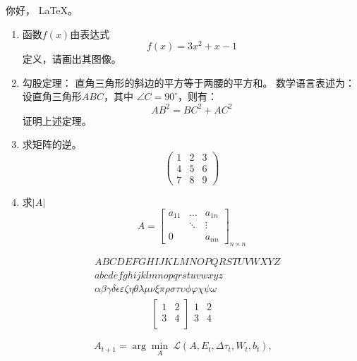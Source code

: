 \documentclass[UTF8,a4paper,12pt]{ctexart}
\newcommand{\degree}{^\circ}
\begin{document}
 你好， \LaTeX 。
 
 \begin{enumerate}
 	\item 函数$f(x)$由表达式$$f(x)=3x^2+x-1$$定义，请画出其图像。
 	
 	\item
 	勾股定理：
 	直角三角形的斜边的平方等于两腰的平方和。
 	数学语言表述为：设直角三角形$ABC$，其中 $\angle C=90\degree$，则有：
 	\begin{equation}
 	AB^2 = BC^2 + AC^2	
 	\end{equation}
 	证明上述定理。
 	
 	\item
 	求矩阵的逆。
 	\[
 	\begin{pmatrix}
 	1 & 2 & 3 \\
 	4 & 5 & 6 \\
 	7 & 8 & 9
 	\end{pmatrix}
 	\]
 	
 	\item
 	求$|A|$
 	\[
 	A = \begin{bmatrix}
 	a_{11} & \dots & a_{1n} \\
 	\         & \ddots & \vdots \\
 	0 & & a_{nn}
 	
 	\end{bmatrix}_{n \times n}
 	\]

 \end{enumerate}
 
 \begin{align}
 & ABCDEFGHIJKLMNOPQRSTUVWXYZ \label{eq:alphabet} \\
 & abcdefghijklmnopqrstuvwxyz \\
 & \alpha \beta \gamma \delta \epsilon \varepsilon \zeta \eta \theta \lambda \mu \nu \xi \pi \rho \sigma \tau \upsilon \phi \varphi \chi \psi \omega  
 \end{align}
 \begin{align}
 \begin{bmatrix}
 1 & 2 \\
 3 & 4 \\
 \end{bmatrix}
 \begin{matrix}
 1 & 2 \\
 3 & 4 \\
 \end{matrix}
 \end{align}
 
 \begin{equation}
 A_{t+1} = \arg\min_A \ \mathcal{L}(A,E_t,\Delta\tau_t,W_t,b_t), \nonumber
 \end{equation}
 
\end{document}
